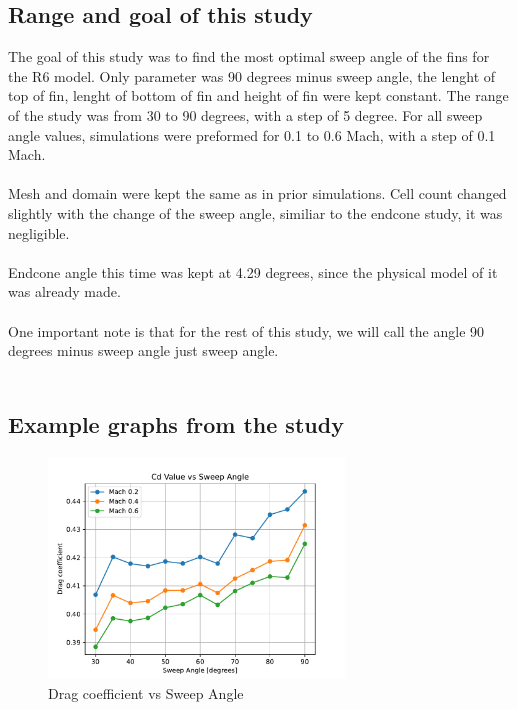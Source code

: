 \documentclass{article}
\begin{document}
\subsection{Range and goal of this study}
The goal of this study was to find the most optimal sweep angle of the fins for the R6 model. 
Only parameter was 90 degrees minus sweep angle, the lenght of top of fin, lenght of bottom of fin and height of 
fin were kept constant. The range of the study was from 30 to 90 degrees, with a step of 5 degree. 
For all sweep angle values, simulations were preformed for 0.1 to 0.6 Mach, with a step of 0.1 Mach.\\\\
Mesh and domain were kept the same as in prior simulations. Cell count changed slightly with the 
change of the sweep angle, similiar to the endcone study, it was negligible.\\\\
Endcone angle this time was kept at 4.29 degrees, since the physical model of it was already made.\\\\
One important note is that for the rest of this study, we will call the angle 90 degrees minus sweep 
angle just sweep angle.\\\\


\subsection{Example graphs from the study}

\begin{figure}[H]
    \centering
    \includegraphics[width=0.7\textwidth]{../data/R6-Parametric-Fins/CDvsSweep.pdf}
    \caption{Drag coefficient vs Sweep Angle}
    \label{fig:CdVsSweep}
\end{figure}
\end{document}
